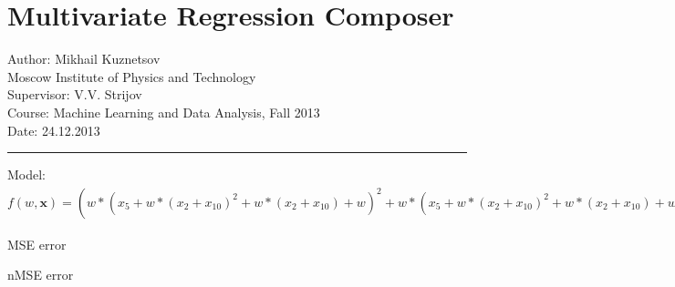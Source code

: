 \documentclass[12pt]{article}
\begin{document}
\section*{Multivariate Regression Composer}
Author: Mikhail Kuznetsov\\
Moscow Institute of Physics and Technology\\
Supervisor: V.V. Strijov\\
Course: Machine Learning and Data Analysis, Fall 2013\\
Date: 24.12.2013\\
\hrule
\vspace{1cm}
Model: $f(w,\mathbf{x})=(w*(x_5+w*(x_2+x_10)^2+w*(x_2+x_10)+w)^2+w*(x_5+w*(x_2+x_10)^2+w*(x_2+x_10)+w)+w)*((w*(x_5+w+x_13-((w*(x_2+w+x_2)^2+w*(x_2+w+x_2)+w)*(w*(w*(x_7)^2+w*(x_7)+w+x_12+x_12)^2+w*(w*(x_7)^2+w*(x_7)+w+x_12+x_12)+w))-((w*(x_5+x_2)^2+w*(x_5+x_2)+w)*(w*(x_4)^2+w*(x_4)+w)))^2+w*(x_5+w+x_13-((w*(x_2+w+x_2)^2+w*(x_2+w+x_2)+w)*(w*(w*(x_7)^2+w*(x_7)+w+x_12+x_12)^2+w*(w*(x_7)^2+w*(x_7)+w+x_12+x_12)+w))-((w*(x_5+x_2)^2+w*(x_5+x_2)+w)*(w*(x_4)^2+w*(x_4)+w)))+w)*(w*(x_4)^2+w*(x_4)+w))$

MSE error

nMSE error
\end{document}
